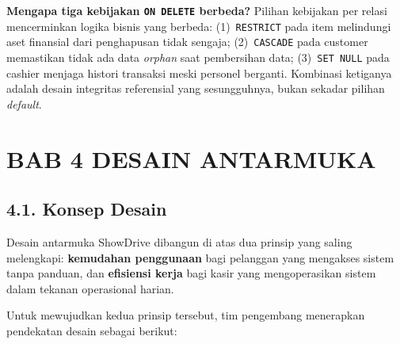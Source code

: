 \documentclass[11pt, a5paper]{article}
\begin{document}
\begin{infobox}
\textbf{Mengapa tiga kebijakan \texttt{ON DELETE} berbeda?} Pilihan kebijakan
per relasi mencerminkan logika bisnis yang berbeda: (1)~\texttt{RESTRICT} pada
item melindungi aset finansial dari penghapusan tidak sengaja; (2)~\texttt{CASCADE}
pada customer memastikan tidak ada data \textit{orphan} saat pembersihan data;
(3)~\texttt{SET NULL} pada cashier menjaga histori transaksi meski personel
berganti. Kombinasi ketiganya adalah desain integritas referensial yang
sesungguhnya, bukan sekadar pilihan \textit{default}.
\end{infobox}

\newpage

\section*{BAB 4 DESAIN ANTARMUKA}

\subsection*{4.1. Konsep Desain}

Desain antarmuka ShowDrive dibangun di atas dua prinsip yang saling melengkapi:
\textbf{kemudahan penggunaan} bagi pelanggan yang mengakses sistem tanpa
panduan, dan \textbf{efisiensi kerja} bagi kasir yang mengoperasikan sistem
dalam tekanan operasional harian.

Untuk mewujudkan kedua prinsip tersebut, tim pengembang menerapkan pendekatan
desain sebagai berikut:
\end{document}
